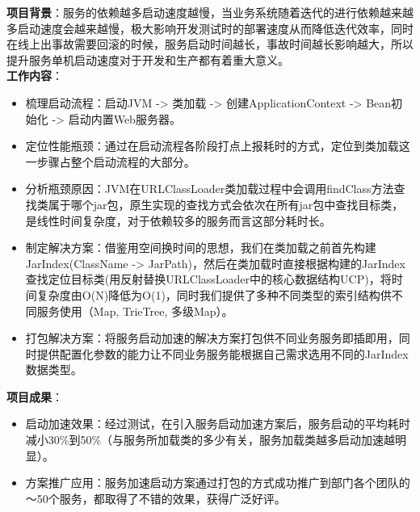
\begin{onehalfspacing}
\textbf{项目背景}：服务的依赖越多启动速度越慢，当业务系统随着迭代的进行依赖越来越多启动速度会越来越慢，极大影响开发测试时的部署速度从而降低迭代效率，同时在线上出事故需要回滚的时候，服务启动时间越长，事故时间越长影响越大，所以提升服务单机启动速度对于开发和生产都有着重大意义。\\

\textbf{工作内容}：
\begin{itemize}
  \item 梳理启动流程：启动JVM -> 类加载 -> 创建ApplicationContext -> Bean初始化 -> 启动内置Web服务器。
  \item 定位性能瓶颈：通过在启动流程各阶段打点上报耗时的方式，定位到类加载这一步骤占整个启动流程的大部分。
  \item 分析瓶颈原因：JVM在URLClassLoader类加载过程中会调用findClass方法查找类属于哪个jar包，原生实现的查找方式会依次在所有jar包中查找目标类，是线性时间复杂度，对于依赖较多的服务而言这部分耗时长。
  \item 制定解决方案：借鉴用空间换时间的思想，我们在类加载之前首先构建JarIndex(ClassName -> JarPath)，然后在类加载时直接根据构建的JarIndex查找定位目标类(用反射替换URLClassLoader中的核心数据结构UCP)，将时间复杂度由O(N)降低为O(1)，同时我们提供了多种不同类型的索引结构供不同服务使用（Map, TrieTree, 多级Map）。
  \item 打包解决方案：将服务启动加速的解决方案打包供不同业务服务即插即用，同时提供配置化参数的能力让不同业务服务能根据自己需求选用不同的JarIndex数据类型。\\
\end{itemize}

\textbf{项目成果}：
\begin{itemize}
  \item 启动加速效果：经过测试，在引入服务启动加速方案后，服务启动的平均耗时减小30\%到50\%（与服务所加载类的多少有关，服务加载类越多启动加速越明显）。
  \item 方案推广应用：服务加速启动方案通过打包的方式成功推广到部门各个团队的～50个服务，都取得了不错的效果，获得广泛好评。\\
\end{itemize}
\end{onehalfspacing}

